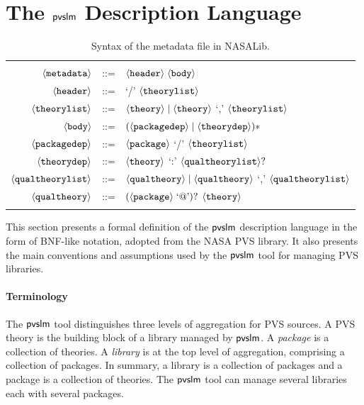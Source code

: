 \section{The $\textsf{pvslm}$ Description Language}
\label{sec.conf}

\begin{table}[pthb]
  \centering
  \begin{tabular}{r c p{8cm}}
    \hline \\
    $\langle{\texttt{metadata}}\rangle$ & ::= & $\langle{\texttt{header}}\rangle \; \langle{\texttt{body}}\rangle$ \\
    $\langle{\texttt{header}}\rangle$ & ::= & `/' $\langle{\texttt{theorylist}}\rangle$ \\
    $\langle{\texttt{theorylist}}\rangle$ & ::= & $\langle{\texttt{theory}}\rangle \mid \langle{\texttt{theory}}\rangle$ `,' $\langle{\texttt{theorylist}}\rangle$ \\
    $\langle{\texttt{body}}\rangle$ & ::= & $(\langle{\texttt{packagedep}}\rangle \mid \langle{\texttt{theorydep}}\rangle)*$ \\
    $\langle{\texttt{packagedep}}\rangle$ & ::= & $\langle{\texttt{package}}\rangle$ `/' $\langle{\texttt{theorylist}}\rangle$ \\
    $\langle{\texttt{theorydep}}\rangle$ & ::= & $\langle{\texttt{theory}}\rangle$ `:' $\langle{\texttt{qualtheorylist}}\rangle ?$ \\
    $\langle{\texttt{qualtheorylist}}\rangle$ & ::= & $\langle{\texttt{qualtheory}}\rangle \mid \langle{\texttt{qualtheory}}\rangle$ `,' $\langle{\texttt{qualtheorylist}}\rangle$ \\
    $\langle{\texttt{qualtheory}}\rangle$ & ::= & $(\langle{\texttt{package}}\rangle\; \text{`@'})?$ $\langle{\texttt{theory}}\rangle$ \\
    \\
    \hline
  \end{tabular}
  \caption{Syntax of the  metadata file in NASALib.}
  \label{tab.bnf}
\end{table}

This section presents a formal definition of the $\textsf{pvslm}$ description
language in the form of BNF-like notation, adopted from the NASA PVS
library. It also presents the main conventions and assumptions used 
by the $\textsf{pvslm}$ tool for managing PVS libraries.

\paragraph{Terminology}
The $\textsf{pvslm}$ tool distinguishes three levels of aggregation for PVS
sources. A PVS theory is the building block of a library managed by
$\textsf{pvslm}$. A {\em package} is a collection of theories.  A {\em
  library} is at the top level of aggregation, comprising a collection
of packages. In summary, a library is a collection of packages and a
package is a collection of theories. The $\textsf{pvslm}$ tool can manage
several libraries each with several packages.

